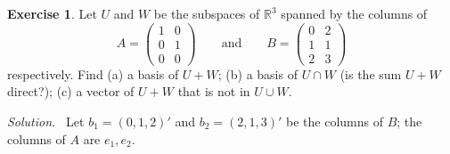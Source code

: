 \documentclass[12pt]{article}
\newcommand{\R}{\mathbb R}
\theoremstyle{definition}
\newtheorem{exercise}{Exercise}
\newenvironment{solution}{\par\noindent\textit{Solution.}\ }{\par\smallskip}
\begin{document}
\begin{exercise}\label{r3-ex-sum-intersection}
Let \(U\) and \(W\) be the subspaces of \(\R^3\) spanned by the columns of
\[
A=\begin{pmatrix}1&0\\0&1\\0&0\end{pmatrix}\qquad\text{and}\qquad
B=\begin{pmatrix}0&2\\1&1\\2&3\end{pmatrix}
\]
respectively. Find (a) a basis of \(U+W\); (b) a basis of \(U\cap W\) (is the sum \(U+W\)
direct?); (c) a vector of \(U+W\) that is not in \(U\cup W\).
\end{exercise}
\begin{solution}
Let \(b_1=(0,1,2)'\) and \(b_2=(2,1,3)'\) be the columns of \(B\); the columns of \(A\) are
\(e_1,e_2\).


\end{solution}
\end{document}
